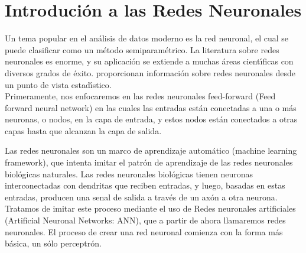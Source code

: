 \section{Introduci\'on a las Redes Neuronales}
		Un tema popular en el an\'alisis de datos moderno es la red neuronal, el cual se puede clasificar como un m\'etodo semiparam\'etrico. La literatura sobre redes neuronales es enorme, y su aplicaci\'on se extiende a muchas \'areas cient\'{\i}ficas con diversos grados de \'exito. \cite{cheng1994neural} proporcionan informaci\'on sobre redes neuronales desde un punto de vista estad\'{\i}stico. \\
		Primeramente, nos enfocaremos en las redes neuronales feed-forward (Feed forward neural network) en las cuales las entradas est\'an conectadas a una o m\'as neuronas, o nodos, en la capa de entrada, y estos nodos est\'an conectados a otras capas hasta que alcanzan la capa de salida. 
		
	Las redes neuronales son un marco de aprendizaje autom\'atico (machine learning framework), que intenta imitar el patr\'on de aprendizaje de las redes neuronales biol\'ogicas naturales. Las redes neuronales biol\'ogicas tienen neuronas interconectadas con dendritas que reciben entradas, y luego, basadas en estas entradas, producen una senal de salida a trav\'es de un ax\'on a otra neurona. Tratamos de imitar este proceso mediante el uso de Redes neuronales artificiales (Artificial Neuronal Networks: ANN), que a partir de ahora llamaremos redes neuronales. El proceso de crear una red neuronal comienza con la forma m\'as b\'asica, un s\'olo perceptr\'on.
	
